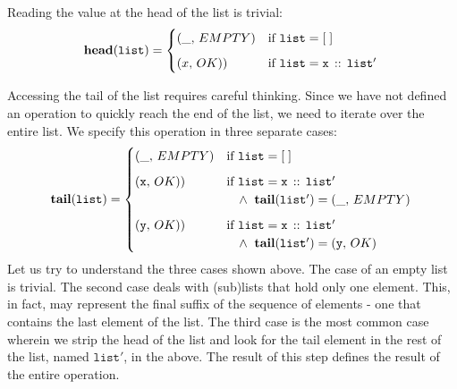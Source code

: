 \documentclass[10pt]{article}
\begin{document}
  \noindent Reading the value at the head of the list is trivial:
    \[
        \mathtt{\mathbf{head}(list)} = \begin{cases}
            (\_, \,EMPTY) & \mbox{if } \mathtt{list} = [\;]\vspace*{6pt}\\
            (x, \,OK)) & \mbox{if } \mathtt{list = x \, ::\, list'}\\
        \end{cases}\vspace*{6pt}\\
    \]

  \noindent Accessing the tail of the list requires careful thinking. Since we have not defined an operation to quickly reach the end of the list, we need to iterate over the entire list. We specify this operation in three separate cases:
    \[
        \mathtt{\mathbf{tail}(list)} = \begin{cases}
            (\_, \,EMPTY) & \mbox{if } \mathtt{list} = [\;]\vspace*{6pt}\\
            (\mathtt{x}, \,OK)) & \mbox{if } \mathtt{list = x \, ::\, list'} \\
                                    & \hspace*{10pt}\wedge\;\; \mathtt{\mathbf{tail}(list')} = (\_, \, EMPTY)\vspace*{6pt}\\
            (\mathtt{y}, \,OK)) & \mbox{if } \mathtt{list = x \, ::\, list'} \\
                                    & \hspace*{10pt}\wedge\;\; \mathtt{\mathbf{tail}(list')} = (\mathtt{y}, \, OK)\\
        \end{cases}\vspace*{2pt}\\
    \]
  \noindent Let us try to understand the three cases shown above. The case of an empty list is trivial. The second case deals with (sub)lists that hold only one element. This, in fact, may represent the final suffix of the sequence of elements - one that contains the last element of the list. The third case is the most common case wherein we strip the head of the list and look for the tail element in the rest of the list, named $\mathtt{list'}$, in the above. The result of this step defines the result of the entire operation.
\end{document}
